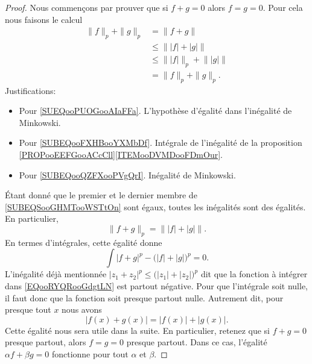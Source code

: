 \begin{proof}
	Nous commençons par prouver que si \( f+g=0\) alors \( f=g=0\). Pour cela nous faisons le calcul
	\begin{subequations}		\label{SUBEQSooGHMTooWSTtOn}
		\begin{align}
			\| f \|_p+\| g \|_p & =\| f+g \|		\label{SUEQooPUOGooAIaFFa}                                        \\
			                    & \leq \big\| | f |+| g |  \big\|		\label{SUBEQooFXHBooYXMbDf}                  \\
			                    & \leq \big\| | f |  \big\|_p+\big\|  | g | \big\|	\label{SUBEQooQZFXooPVgQrI} \\
			                    & = \| f \|_p+\| g \|_p.
		\end{align}
	\end{subequations}
	Justifications:
	\begin{itemize}
		\item
		      Pour \eqref{SUEQooPUOGooAIaFFa}. L'hypothèse d'égalité dans l'inégalité de Minkowski.
		\item
		      Pour \eqref{SUBEQooFXHBooYXMbDf}. Intégrale de l'inégalité de la proposition \ref{PROPooEEFGooACcCll}\ref{ITEMooDVMDooFDmOur}.
		\item
		      Pour \eqref{SUBEQooQZFXooPVgQrI}. Inégalité de Minkowski.
	\end{itemize}
	Étant donné que le premier et le dernier membre de \eqref{SUBEQSooGHMTooWSTtOn} sont égaux, toutes les inégalités sont des égalités. En particulier,
	\begin{equation}
		\| f+g \|_p=\big\| | f |+| g |  \big\|.
	\end{equation}
	En termes d'intégrales, cette égalité donne
	\begin{equation}		\label{EQooRYQRooGdgtLN}
		\int| f+g |^p-\big( | f |+| g | \big)^p=0.
	\end{equation}
	L'inégalité déjà mentionnée \( | z_1+z_2 |^p\leq \big( | z_1 |+| z_2 | \big)^p\) dit que la fonction à intégrer dans \eqref{EQooRYQRooGdgtLN} est partout négative. Pour que l'intégrale soit nulle, il faut donc que la fonction soit presque partout nulle. Autrement dit, pour presque tout \( x\) nous avons
	\begin{equation}		\label{EQooULHAooWXViEH}
		| f(x)+g(x) |=| f(x) |+| g(x) |.
	\end{equation}
	Cette égalité nous sera utile dans la suite. En particulier, retenez que si \( f+g=0\) presque partout, alors \( f=g=0\) presque partout. Dans ce cas, l'égalité \( \alpha f+\beta g=0\) fonctionne pour tout \( \alpha\) et \( \beta\).


\end{proof}
